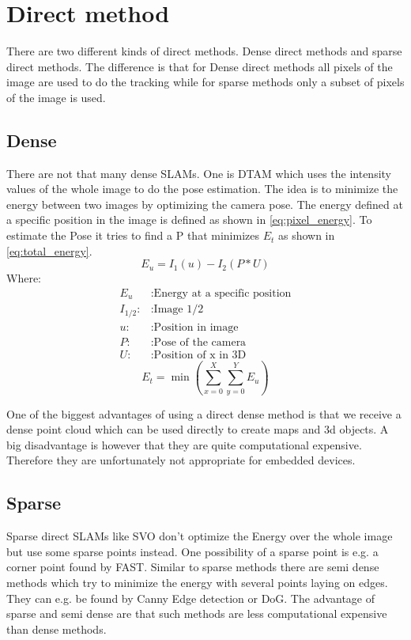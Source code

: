 \documentclass[11pt,a4paper,titlepage,oneside]{report}
\begin{document}
\section{Direct method}

There are two different kinds of direct methods. Dense direct methods and sparse direct methods. The difference is that for Dense direct methods all pixels of the image are used to do the tracking while for sparse methods only a subset of pixels of the image is used.

\subsection{Dense}

There are not that many dense SLAMs. One is DTAM which uses the intensity values of the whole image to do the pose estimation. The idea is to minimize the energy between two images by optimizing the camera pose. The energy defined at a specific position in the image is defined as shown in \ref{eq:pixel_energy}. To estimate the Pose it tries to find a P that minimizes $E_{t}$ as shown in \ref{eq:total_energy}.
\begin{equation}\label{eq:pixel_energy}
  E_{u}=I_1(u)-I_2(P*U)
\end{equation}
Where:
\begin{align*}
  E_{u}		&: \text{Energy at a specific position}\\
  I_{1/2}:	&: \text{Image 1/2}\\
  u:		&: \text{Position in image} \\
  P:		&: \text{Pose of the camera} \\
  U:		&: \text{Position of x in 3D}
\end{align*}
\begin{equation}\label{eq:total_energy}
  E_{t}=\min(\sum_{x=0}^X\sum_{y=0}^YE_u)
\end{equation}

One of the biggest advantages of using a direct dense method is that we receive a dense point cloud which can be used directly to create maps and 3d objects. A big disadvantage is however that they are quite computational expensive. Therefore they are unfortunately not appropriate for embedded devices.

\subsection{Sparse}

Sparse direct SLAMs like SVO don't optimize the Energy over the whole image but use some sparse points instead. One possibility of a sparse point is e.g. a corner point found by FAST. Similar to sparse methods there are semi dense methods which try to minimize the energy with several points laying on edges. They can e.g. be found by Canny Edge detection or DoG. The advantage of sparse and semi dense are that such methods are less computational expensive than dense methods.\\\\
\end{document}
